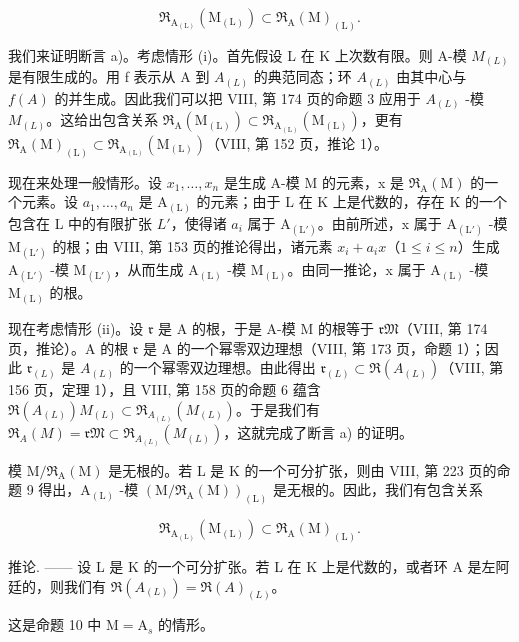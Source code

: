 \[
\mathfrak {R} _ {\mathrm{A} _ {(\mathrm{L})}} (\mathrm{M} _ {(\mathrm{L})}) \subset \mathfrak {R} _ {\mathrm{A}} (\mathrm{M}) _ {(\mathrm{L})}.
\]

我们来证明断言 a)。考虑情形 (i)。首先假设 L 在 K 上次数有限。则 A-模 \(M_{(L)}\) 是有限生成的。用 f 表示从 A 到 \(A_{(L)}\) 的典范同态；环 \(A_{(L)}\) 由其中心与 \(f(A)\) 的并生成。因此我们可以把 VIII, 第 174 页的命题 3 应用于 \(A_{(L)}\) -模 \(M_{(L)}\)。这给出包含关系 \(\mathfrak{R}_{\mathrm{A}}(\mathrm{M}_{(\mathrm{L})}) \subset \mathfrak{R}_{\mathrm{A}_{(\mathrm{L})}}(\mathrm{M}_{(\mathrm{L})})\)，更有 \(\mathfrak{R}_{\mathrm{A}}(\mathrm{M})_{(\mathrm{L})} \subset \mathfrak{R}_{\mathrm{A}_{(\mathrm{L})}}(\mathrm{M}_{(\mathrm{L})})\)（VIII, 第 152 页，推论 1）。

现在来处理一般情形。设 \(x_{1},\ldots,x_{n}\) 是生成 A-模 M 的元素，x 是 \(\mathfrak{R}_{\mathrm{A}}(\mathrm{M})\) 的一个元素。设 \(a_{1},\ldots,a_{n}\) 是 \(\mathrm{A}_{(\mathrm{L})}\) 的元素；由于 L 在 K 上是代数的，存在 K 的一个包含在 L 中的有限扩张 \(L'\)，使得诸 \(a_{i}\) 属于 \(\mathrm{A}_{(\mathrm{L}')}\)。由前所述，x 属于 \(\mathrm{A}_{(\mathrm{L}')}\) -模 \(\mathrm{M}_{(\mathrm{L}')}\) 的根；由 VIII, 第 153 页的推论得出，诸元素 \(x_{i}+a_{i}x\)（\(1\leqslant i\leqslant n\)）生成 \(\mathrm{A}_{(\mathrm{L}')}\) -模 \(\mathrm{M}_{(\mathrm{L}')}\)，从而生成 \(\mathrm{A}_{(\mathrm{L})}\) -模 \(\mathrm{M}_{(\mathrm{L})}\)。由同一推论，x 属于 \(\mathrm{A}_{(\mathrm{L})}\) -模 \(\mathrm{M}_{(\mathrm{L})}\) 的根。

现在考虑情形 (ii)。设 \(\mathfrak{r}\) 是 A 的根，于是 A-模 M 的根等于 \(\mathfrak{rM}\)（VIII, 第 174 页，推论）。A 的根 \(\mathfrak{r}\) 是 A 的一个幂零双边理想（VIII, 第 173 页，命题 1）；因此 \(\mathfrak{r}_{(L)}\) 是 \(A_{(L)}\) 的一个幂零双边理想。由此得出 \(\mathfrak{r}_{(L)} \subset \Re(A_{(L)})\)（VIII, 第 156 页，定理 1），且 VIII, 第 158 页的命题 6 蕴含 \(\Re(A_{(L)})M_{(L)} \subset \Re_{A_{(L)}}(M_{(L)})\)。于是我们有 \(\Re_A(M) = \mathfrak{rM} \subset \Re_{A_{(L)}}(M_{(L)})\)，这就完成了断言 a) 的证明。

模 \(\mathrm{M}/\mathfrak{R}_{\mathrm{A}}(\mathrm{M})\) 是无根的。若 L 是 K 的一个可分扩张，则由 VIII, 第 223 页的命题 9 得出，\(\mathrm{A}_{(\mathrm{L})}\) -模 \((\mathrm{M}/\mathfrak{R}_{\mathrm{A}}(\mathrm{M}))_{(\mathrm{L})}\) 是无根的。因此，我们有包含关系

\[
\mathfrak {R} _ {\mathrm{A} _ {(\mathrm{L})}} (\mathrm{M} _ {(\mathrm{L})}) \subset \mathfrak {R} _ {\mathrm{A}} (\mathrm{M}) _ {(\mathrm{L})}.
\]

推论. —— 设 L 是 K 的一个可分扩张。若 L 在 K 上是代数的，或者环 A 是左阿廷的，则我们有 \(\mathfrak{R}(A_{(L)}) = \mathfrak{R}(A)_{(L)}\)。

这是命题 10 中 \(\mathrm{M} = \mathrm{A}_s\) 的情形。

